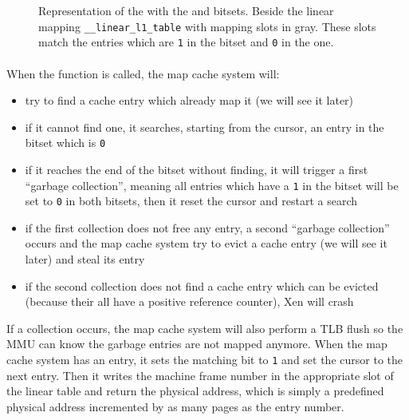 \begin{figure}
  \caption{\label{figure dcache scheme}Representation of the \dcache with
    the \inuse and \garbage bitsets.
    Beside the linear mapping \texttt{\_\_linear\_l1\_table} with mapping slots
    in gray.
    These slots match the entries which are \texttt{1} in the \inuse bitset and
    \texttt{0} in the \garbage one.}
\end{figure}

\paragraph{}
When the \map function is called, the map cache system will:
\begin{itemize}
\item try to find a cache entry which already map it (we will see it later)
\item if it cannot find one, it searches, starting from the cursor, an entry in
  the \inuse bitset which is \texttt{0}
\item if it reaches the end of the bitset without finding, it will trigger a
  first ``garbage collection'', meaning all entries which have a \texttt{1}
  in the \garbage bitset will be set to \texttt{0} in both bitsets, then
  it reset the cursor and restart a search
\item if the first collection does not free any entry, a second
  ``garbage collection'' occurs and the map cache system try to evict a cache
  entry (we will see it later) and steal its \inuse entry
\item if the second collection does not find a cache entry which can be evicted
  (because their all have a positive reference counter), Xen will crash
\end{itemize}
If a collection occurs, the map cache system will also perform a TLB flush so
the MMU can know the garbage entries are not mapped anymore.
When the map cache system has an entry, it sets the matching \inuse bit to
\texttt{1} and set the cursor to the next entry.
Then it writes the machine frame number in the appropriate slot of the linear
table and return the physical address, which is simply a predefined physical
address incremented by as many pages as the entry number.

